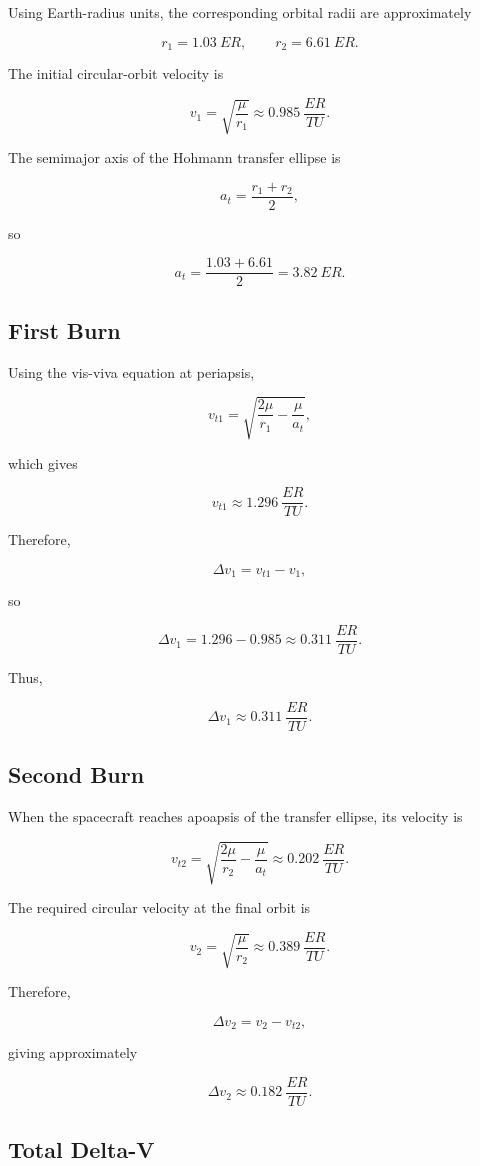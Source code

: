 \documentclass{article}
\begin{document}
Using Earth-radius units, the corresponding orbital radii are approximately

\[
r_1 = 1.03~ER,
\qquad
r_2 = 6.61~ER.
\]

The initial circular-orbit velocity is

\[
v_1
=
\sqrt{\frac{\mu}{r_1}}
\approx
0.985~\frac{ER}{TU}.
\]

The semimajor axis of the Hohmann transfer ellipse is

\[
a_t
=
\frac{r_1+r_2}{2},
\]

so

\[
a_t
=
\frac{1.03+6.61}{2}
=
3.82~ER.
\]


\subsection{First Burn}

Using the vis-viva equation at periapsis,

\[
v_{t1}
=
\sqrt{
\frac{2\mu}{r_1}
-
\frac{\mu}{a_t}
},
\]

which gives

\[
v_{t1}
\approx
1.296~\frac{ER}{TU}.
\]

Therefore,

\[
\Delta v_1
=
v_{t1}-v_1,
\]

so

\[
\Delta v_1
=
1.296-0.985
\approx
0.311~\frac{ER}{TU}.
\]

Thus,

\[
\boxed{
\Delta v_1
\approx
0.311~\frac{ER}{TU}
}.
\]


\subsection{Second Burn}

When the spacecraft reaches apoapsis of the transfer ellipse, its velocity is

\[
v_{t2}
=
\sqrt{
\frac{2\mu}{r_2}
-
\frac{\mu}{a_t}
}
\approx
0.202~\frac{ER}{TU}.
\]

The required circular velocity at the final orbit is

\[
v_2
=
\sqrt{\frac{\mu}{r_2}}
\approx
0.389~\frac{ER}{TU}.
\]

Therefore,

\[
\Delta v_2
=
v_2-v_{t2},
\]

giving approximately

\[
\boxed{
\Delta v_2
\approx
0.182~\frac{ER}{TU}
}.
\]


\subsection{Total Delta-V}
\end{document}
